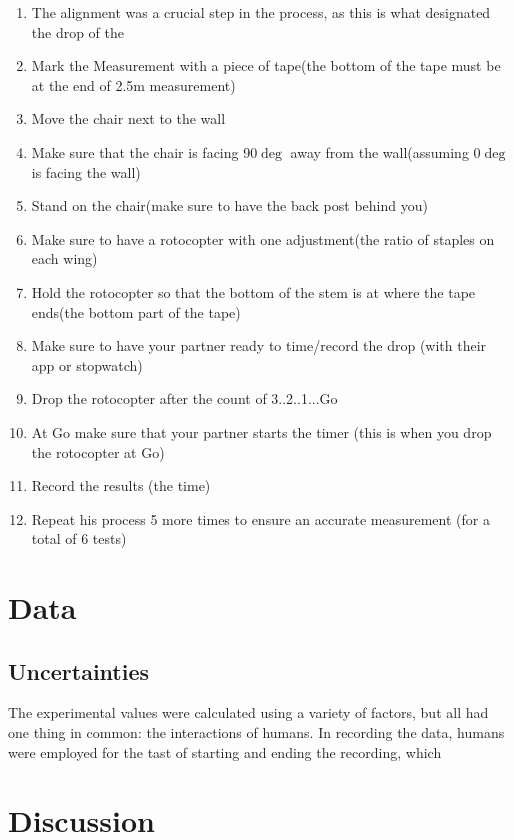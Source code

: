 \documentclass[]{article}
\begin{document}
\begin{enumerate}
    \item The alignment was a crucial step in the process, as this is what designated the drop of the 
    \item Mark the Measurement with a piece of tape(the bottom of the tape must be at the end of 2.5m measurement) 
    \item Move the chair next to the wall
    \item Make sure that the chair is facing 90$\deg$ away from the wall(assuming 0$\deg$ is facing the wall)
    \item Stand on the chair(make sure to have the back post behind you)
    \item Make sure to have a rotocopter with one adjustment(the ratio of staples on each wing)
    \item Hold the rotocopter so that the bottom of the stem is at where the tape ends(the bottom part of the tape)
    \item Make sure to have your partner ready to time/record the drop (with their app or stopwatch)
    \item Drop the rotocopter after the count of 3..2..1...Go
    \item At Go make sure that your partner starts the timer (this is when you drop the rotocopter at Go)
    \item Record the results (the time)
    \item Repeat his process 5 more times to ensure an accurate measurement (for a total of 6 tests)
\end{enumerate}


\section{Data}

\subsection{Uncertainties}
The experimental values were calculated using a variety of factors, but all had one thing in common: the interactions of humans. In recording the data, humans were employed for the tast of starting and ending the recording, which 

\section{Discussion}
\end{document}
